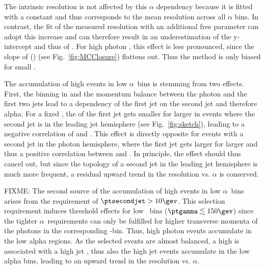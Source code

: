 The intrinsic resolution is not affected by this $\alpha$ dependency because it is fitted with a constant and thus corresponds to the mean resolution across all $\alpha$ bins.
In contrast, the fit of the measured resolution with an additional free parameter can adopt this increase and can therefore result in an underestimation of the y-intercept and thus of \jer. 
For high photon \pt, this effect is less pronounced, since the slope of \jer(\ptgamma) (see Fig.~\ref{fig:MCClosure}) flattens out. Thus the method is only biased for small \ptgamma.

The accumulation of high \ptfirstjet events in low $\alpha$~bins is stemming from two effects.
First, the binning in \ptgamma and the momentum balance between the photon and the first two jets lead to a dependency of the first jet \pt on the second jet \pt and therefore alpha: 
For a fixed \ptgamma, the \pt of the first jet gets smaller for larger \ptsecondjet in events where the second jet is in the leading jet hemisphere (see Fig.~\ref{fig:sketch}), leading to a negative correlation of \ptfirstjet and \ptsecondjet.
This effect is directly opposite for events with a second jet in the photon hemisphere, where the first jet \pt gets larger for larger \ptsecondjet and thus a positive correlation between \ptfirstjet and \ptsecondjet. 
In principle, the effect should thus cancel out, but since the topology of a second jet in the leading jet hemisphere is much more frequent, a residual upward trend in the resolution vs. $\alpha$ is conserved. 

FIXME: The second source of the accumulation of high \ptfirstjet events in low $\alpha$~bins arises from the requirement of $\ptsecondjet>10\gev$.
This selection requirement induces threshold effects for low \ptgamma~bins ($\ptgamma\lesssim 150\gev$) since the tighter $\alpha$~requirements can only be fulfilled for higher transverse momenta of the photons in the corresponding \ptgamma-bin.
Thus, high photon \pt events accumulate in the low alpha regions. 
As the selected events are almost balanced, a high \ptgamma is associated with a high jet \pt, thus also the high jet \pt events accumulate in the low alpha bins, leading to  an upward trend in the resolution vs. $\alpha$. \\


